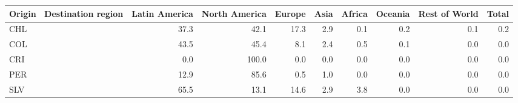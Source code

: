 \begin{tabular}{lrrrrrrrr}
\toprule
Origin \ Destination region & Latin America & North America & Europe & Asia & Africa & Oceania & Rest of World & Total \\
\midrule
CHL & 37.3 & 42.1 & 17.3 & 2.9 & 0.1 & 0.2 & 0.1 & 0.2 \\
COL & 43.5 & 45.4 & 8.1 & 2.4 & 0.5 & 0.1 & 0.0 & 0.0 \\
CRI & 0.0 & 100.0 & 0.0 & 0.0 & 0.0 & 0.0 & 0.0 & 0.0 \\
PER & 12.9 & 85.6 & 0.5 & 1.0 & 0.0 & 0.0 & 0.0 & 0.0 \\
SLV & 65.5 & 13.1 & 14.6 & 2.9 & 3.8 & 0.0 & 0.0 & 0.0 \\
\bottomrule
\end{tabular}
